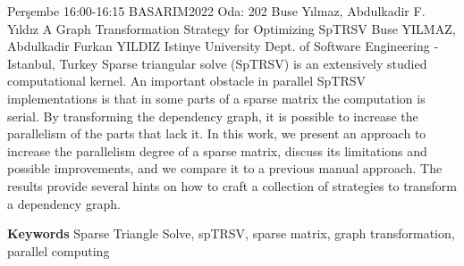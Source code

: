 
    \begin{abstract_basarim}
    {Perşembe 16:00-16:15}
    {BASARIM2022}
    {Oda: 202}
    {Buse Yılmaz, Abdulkadir F. Yıldız}
    {A Graph Transformation Strategy for Optimizing SpTRSV}
    {%
    Buse YILMAZ, Abdulkadir Furkan YILDIZ}
    {%
    }
    {%
    Istinye University Dept. of Software Engineering - Istanbul, Turkey}
    Sparse triangular solve (SpTRSV) is an extensively studied computational kernel. An important obstacle in parallel SpTRSV implementations is that in some parts of a sparse matrix the computation is serial. By transforming the dependency graph, it is possible to increase the parallelism of the parts that lack it. In this work, we present an approach to increase the parallelism degree of a sparse matrix, discuss its limitations and possible improvements, and we compare it to a previous manual approach. The results provide several hints on how to craft a collection of strategies to transform a dependency graph. 
    
        \textbf{Keywords} \newline{}Sparse Triangle Solve, spTRSV, sparse matrix, graph transformation, parallel computing
    \end{abstract_basarim}
    